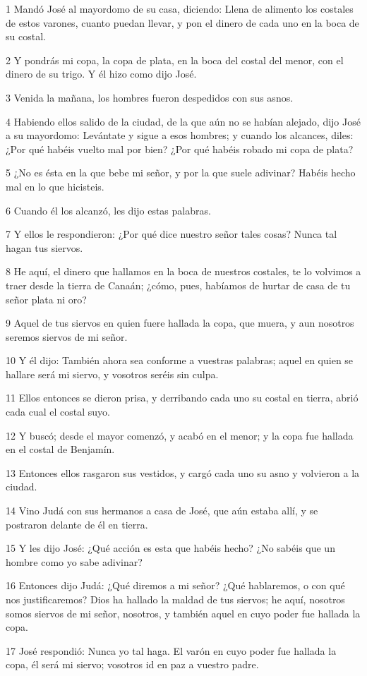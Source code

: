 \par 1 Mandó José al mayordomo de su casa, diciendo: Llena de alimento los costales de estos varones, cuanto puedan llevar, y pon el dinero de cada uno en la boca de su costal.
\par 2 Y pondrás mi copa, la copa de plata, en la boca del costal del menor, con el dinero de su trigo. Y él hizo como dijo José.
\par 3 Venida la mañana, los hombres fueron despedidos con sus asnos.
\par 4 Habiendo ellos salido de la ciudad, de la que aún no se habían alejado, dijo José a su mayordomo: Levántate y sigue a esos hombres; y cuando los alcances, diles: ¿Por qué habéis vuelto mal por bien? ¿Por qué habéis robado mi copa de plata?
\par 5 ¿No es ésta en la que bebe mi señor, y por la que suele adivinar? Habéis hecho mal en lo que hicisteis.
\par 6 Cuando él los alcanzó, les dijo estas palabras.
\par 7 Y ellos le respondieron: ¿Por qué dice nuestro señor tales cosas? Nunca tal hagan tus siervos.
\par 8 He aquí, el dinero que hallamos en la boca de nuestros costales, te lo volvimos a traer desde la tierra de Canaán; ¿cómo, pues, habíamos de hurtar de casa de tu señor plata ni oro?
\par 9 Aquel de tus siervos en quien fuere hallada la copa, que muera, y aun nosotros seremos siervos de mi señor.
\par 10 Y él dijo: También ahora sea conforme a vuestras palabras; aquel en quien se hallare será mi siervo, y vosotros seréis sin culpa.
\par 11 Ellos entonces se dieron prisa, y derribando cada uno su costal en tierra, abrió cada cual el costal suyo.
\par 12 Y buscó; desde el mayor comenzó, y acabó en el menor; y la copa fue hallada en el costal de Benjamín.
\par 13 Entonces ellos rasgaron sus vestidos, y cargó cada uno su asno y volvieron a la ciudad.
\par 14 Vino Judá con sus hermanos a casa de José, que aún estaba allí, y se postraron delante de él en tierra.
\par 15 Y les dijo José: ¿Qué acción es esta que habéis hecho? ¿No sabéis que un hombre como yo sabe adivinar?
\par 16 Entonces dijo Judá: ¿Qué diremos a mi señor? ¿Qué hablaremos, o con qué nos justificaremos? Dios ha hallado la maldad de tus siervos; he aquí, nosotros somos siervos de mi señor, nosotros, y también aquel en cuyo poder fue hallada la copa.
\par 17 José respondió: Nunca yo tal haga. El varón en cuyo poder fue hallada la copa, él será mi siervo; vosotros id en paz a vuestro padre.

